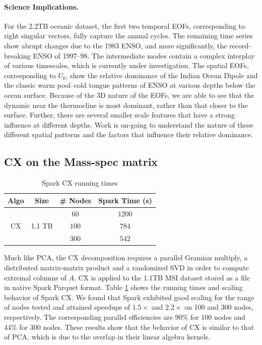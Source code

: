 \paragraph{Science Implications.}
For the 2.2TB oceanic dataset, the first two temporal EOFs, {corresponding to right singular vectors}, fully capture the annual cycles. The remaining time series show abrupt changes due to the 1983 ENSO, and more significantly, the record-breaking ENSO of 1997--98. The intermediate modes contain a complex interplay of various timescales, which is currently under investigation. The spatial EOFs, corresponding to $U_k$, show the relative dominance of the Indian Ocean Dipole and the classic warm pool--cold tongue patterns of ENSO at various depths below the ocean surface. Because of the 3D nature of the EOFs, we are able to see that the dynamic near the thermocline is most dominant, rather than that closer to the surface. Further, there are several smaller scale features that have a strong influence at different depths. Work is on-going to understand the nature of these different spatial patterns and the factors that influence their relative dominance.
 
\subsection{CX on the Mass-spec matrix}
\begin{table}[t]
\centering
\begin{tabular}{|c|c|c|c|} \hline
Algo & Size & \# Nodes & Spark Time (s)\\ \hline
\multirow{3}{*}{CX} & \multirow{3}{*}{1.1 TB} & $60$ & $1200$\\
{} & {} & $100$  & $784$\\
{} & {} & $300$ & $542$\\ \hline
\end{tabular}
\caption{Spark CX running times}
\label{tab:cxscale}
\end{table}
Much like PCA, the CX decomposition requires a parallel Gramian multiply, a distributed matrix-matrix product and a randomized SVD in order to compute extremal columns of $A$. CX is applied to the 1.1TB MSI dataset stored as a file in native Spark Parquet format. Table \ref{tab:cxscale} shows the running times and scaling behavior of Spark CX. We found that Spark exhibited good scaling for the range of nodes tested and attained speedups of $1.5\times$ and $2.2\times$ on 100 and 300 nodes, respectively. The corresponding parallel efficiencies are 90\% for 100 nodes and 44\% for 300 nodes. These results show that the behavior of CX is similar to that of PCA, which is due to the overlap in their linear algebra kernels.

